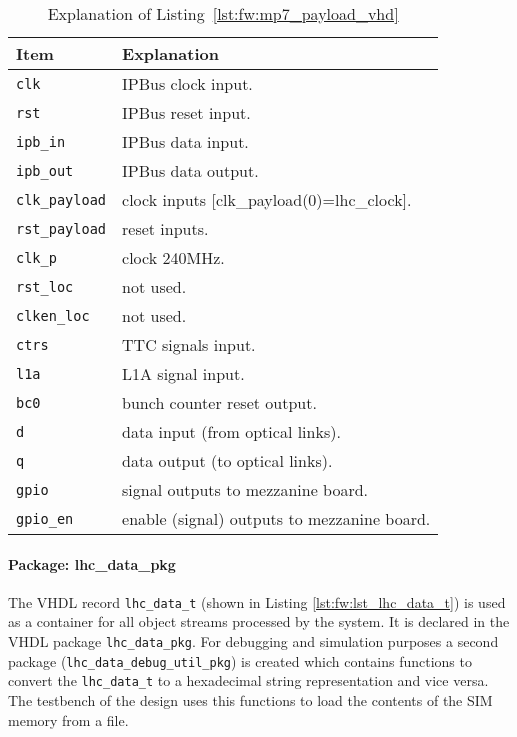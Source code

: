 \medskip
\begin{table}
\footnotesize
\caption{Explanation of Listing~\ref{lst:fw:mp7_payload_vhd}}
\vspace{5mm}
\centering
\begin{tabular}{l p{}}
\toprule
{Item} & {Explanation}\\
\midrule
\verb|clk| & IPBus clock input.\\
\verb|rst| & IPBus reset input.\\
\verb|ipb_in| & IPBus data input.\\
\verb|ipb_out| & IPBus data output.\\
\verb|clk_payload| & clock inputs [clk\_payload(0)=lhc\_clock].\\
\verb|rst_payload| & reset inputs.\\
\verb|clk_p| & clock 240MHz.\\
\verb|rst_loc| & not used.\\
\verb|clken_loc| & not used.\\
\verb|ctrs| & TTC signals input.\\
\verb|l1a| & L1A signal input.\\
\verb|bc0| & bunch counter reset output.\\
\verb|d| & data input (from optical links).\\
\verb|q| & data output (to optical links).\\
\verb|gpio| & signal outputs to mezzanine board.\\
\verb|gpio_en| & enable (signal) outputs to mezzanine board.\\
\bottomrule
\end{tabular}
\label{tab:gtl:explanation_mp7_payload_vhd}
\end{table}

\clearpage

\paragraph{Package: lhc\_data\_pkg} \label{sec:fw:section_lhc_data_pkg}

The VHDL record \texttt{lhc\_data\_t} (shown in Listing \ref{lst:fw:lst_lhc_data_t}) is used as a container for all object streams processed by the system. It is declared in the VHDL package \texttt{lhc\_data\_pkg}.
For debugging and simulation purposes a second package (\texttt{lhc\_data\_debug\_util\_pkg}) is created which contains functions to convert the \texttt{lhc\_data\_t} to a hexadecimal string representation and vice versa. The testbench of the design uses this functions to load the contents of the SIM memory from a file.

